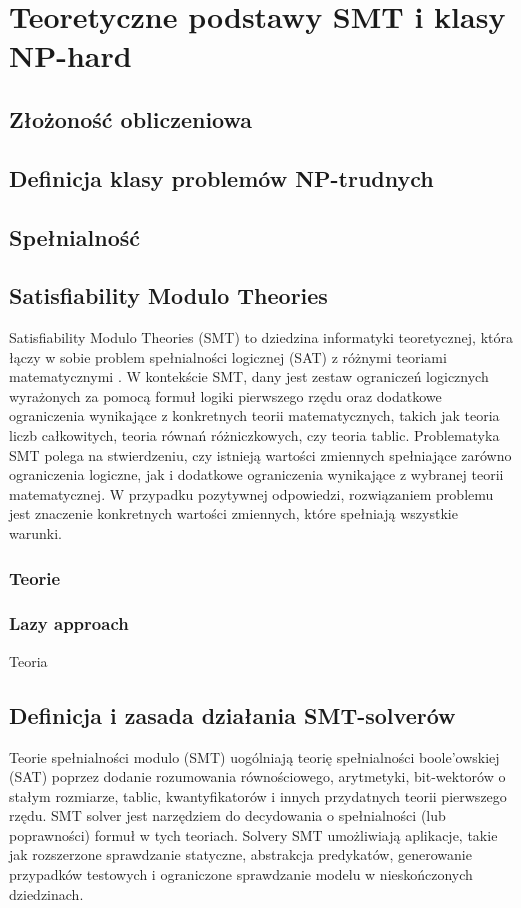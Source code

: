 \chapter{Teoretyczne podstawy SMT i klasy NP-hard}
\section{Złożoność obliczeniowa}

\section{Definicja klasy problemów NP-trudnych}

\section{Spełnialność}


\section{Satisfiability Modulo Theories}
	Satisfiability Modulo Theories (SMT) to dziedzina informatyki teoretycznej, która łączy w sobie problem spełnialności logicznej (SAT) z różnymi teoriami matematycznymi \cite{MouraB11}. 
	W kontekście SMT, dany jest zestaw ograniczeń logicznych wyrażonych za pomocą formuł logiki pierwszego rzędu oraz dodatkowe ograniczenia wynikające z konkretnych teorii matematycznych, takich jak teoria liczb całkowitych, teoria równań różniczkowych, czy teoria tablic.
	Problematyka SMT polega na stwierdzeniu, czy istnieją wartości zmiennych spełniające zarówno ograniczenia logiczne, jak i dodatkowe ograniczenia wynikające z wybranej teorii matematycznej. W przypadku pozytywnej odpowiedzi, rozwiązaniem problemu jest znaczenie konkretnych wartości zmiennych, które spełniają wszystkie warunki.
	\subsection{Teorie}
	\subsection{Lazy approach}
	Teoria 
\section{Definicja i zasada działania SMT-solverów}
Teorie spełnialności modulo (SMT) uogólniają teorię spełnialności boole'owskiej (SAT) poprzez dodanie rozumowania równościowego, arytmetyki, bit-wektorów o stałym rozmiarze, tablic, kwantyfikatorów i innych przydatnych teorii pierwszego rzędu.
SMT solver jest narzędziem do decydowania o spełnialności (lub poprawności) formuł w tych teoriach. 
Solvery SMT umożliwiają aplikacje, takie jak rozszerzone sprawdzanie statyczne, abstrakcja predykatów, generowanie przypadków testowych i ograniczone sprawdzanie modelu w nieskończonych dziedzinach.


